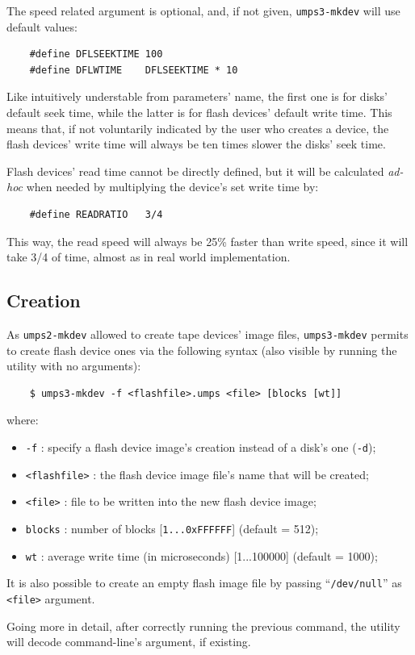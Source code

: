 \documentclass[12pt,a4paper,openright,twoside]{report}
\begin{document}
The speed related argument is optional, and, if not given, \texttt{umps3-mkdev} will use default values:
\begin{verbatim}
	#define DFLSEEKTIME 100
	#define DFLWTIME    DFLSEEKTIME * 10
	\end{verbatim}
Like intuitively understable from parameters' name, the first one is for disks' default seek time, while the latter is for flash devices' default write time. This means that, if not voluntarily indicated by the user who creates a device, the flash devices' write time will always be ten times slower the disks' seek time.

Flash devices' read time cannot be directly defined, but it will be calculated \textit{ad-hoc} when needed by multiplying the device's set write time by:
\begin{verbatim}
	#define READRATIO   3/4
	\end{verbatim}
This way, the read speed will always be 25\% faster than write speed, since it will take 3/4 of time, almost as in real world implementation.

\subsection{Creation}
As \texttt{umps2-mkdev} allowed to create tape devices' image files, \texttt{umps3-mkdev} permits to create flash device ones via the following syntax (also visible by running the utility with no arguments):
\begin{verbatim}
	$ umps3-mkdev -f <flashfile>.umps <file> [blocks [wt]]
	\end{verbatim}
where:
\begin{itemize}
	\item	\texttt{-f} : specify a flash device image's creation instead of a disk's one (\texttt{-d});
	\item	\texttt{<flashfile>} : the flash device image file's name that will be created;
	\item	\texttt{<file>} : file to be written into the new flash device image;
	\item	\texttt{blocks} : number of blocks [\texttt{1...0xFFFFFF}] (default = 512);
	\item	\texttt{wt} : average write time (in microseconds) [1...100000] (default = 1000);
\end{itemize}
It is also possible to create an empty flash image file by passing ``\texttt{/dev/null}'' as \texttt{<file>} argument.

Going more in detail, after correctly running the previous command, the utility will decode command-line's argument, if existing.
\end{document}
